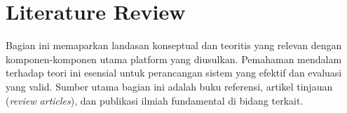 

\section{Literature Review}
\label{sec:literature_review}

Bagian ini memaparkan landasan konseptual dan teoritis yang relevan dengan komponen-komponen utama platform yang diusulkan. Pemahaman mendalam terhadap teori ini esensial untuk perancangan sistem yang efektif dan evaluasi yang valid. Sumber utama bagian ini adalah buku referensi, artikel tinjauan (\textit{review articles}), dan publikasi ilmiah fundamental di bidang terkait.


